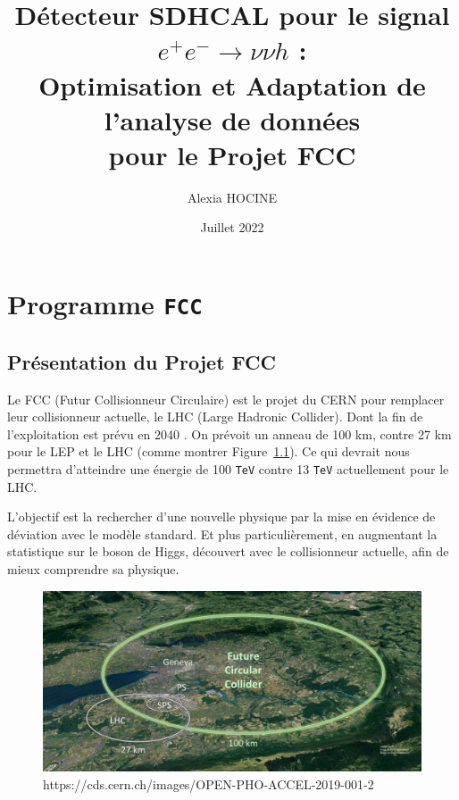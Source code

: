 \documentclass[10pt,a4paper]{report}
\author{Alexia \textsc{HOCINE}}
\title{Détecteur SDHCAL pour le signal  $ e^{+} e^{-} \longrightarrow \nu \nu h $ :\\Optimisation et Adaptation de l'analyse de données\\pour le Projet FCC 
}
\date{Juillet 2022}
\newcommand{\TeV}{\texttt{TeV}\xspace}
\begin{document}






\tableofcontents







\chapter{Programme \texttt{FCC}}

\section{Présentation du Projet FCC}

Le FCC (Futur Collisionneur Circulaire) est le projet du CERN pour remplacer 
leur collisionneur actuelle, le LHC (Large Hadronic Collider). 
Dont la fin de l'exploitation est prévu en 2040 \cite{cern:fcc}.
On prévoit un anneau de 100 km, contre 27 km pour le LEP et le LHC 
(comme montrer Figure~\ref{fcc:img}).
Ce qui devrait nous permettra d'atteindre une énergie de 100 \TeV contre 13 \TeV
actuellement pour le LHC.

L'objectif est la rechercher d'une nouvelle physique par la mise en évidence de déviation avec le modèle standard. Et plus particulièrement, en augmentant la statistique sur le boson de Higgs, découvert avec le collisionneur actuelle, afin de mieux comprendre sa physique.

\begin{figure}[h!]
    \centering
    \includegraphics[width=\textwidth]{../img/FCC.jpg}
    \caption{https://cds.cern.ch/images/OPEN-PHO-ACCEL-2019-001-2}
    \label{fcc:img}
\end{figure}
\end{document}
